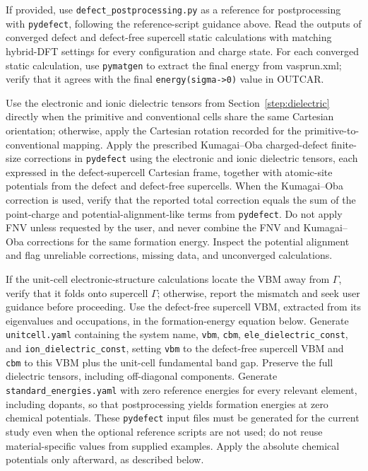 \documentclass[aip,jap,reprint,amsmath,amssymb]{revtex4-2}
\begin{document}
If provided, use \texttt{defect\_postprocessing.py} as a reference for postprocessing with \texttt{pydefect},\cite{Kumagai2021} following the reference-script guidance above. Read the outputs of converged defect and defect-free supercell static calculations with matching hybrid-DFT settings for every configuration and charge state. For each converged static calculation, use \texttt{pymatgen} to extract the final energy from vasprun.xml; verify that it agrees with the final \texttt{energy(sigma->0)} value in OUTCAR.

Use the electronic and ionic dielectric tensors from Section~\ref{step:dielectric} directly when the primitive and conventional cells share the same Cartesian orientation; otherwise, apply the Cartesian rotation recorded for the primitive-to-conventional mapping. Apply the prescribed Kumagai--Oba charged-defect finite-size corrections in \texttt{pydefect} using the electronic and ionic dielectric tensors, each expressed in the defect-supercell Cartesian frame, together with atomic-site potentials from the defect and defect-free supercells. When the Kumagai--Oba correction is used, verify that the reported total correction equals the sum of the point-charge and potential-alignment-like terms from \texttt{pydefect}. Do not apply FNV unless requested by the user, and never combine the FNV and Kumagai--Oba corrections for the same formation energy. Inspect the potential alignment and flag unreliable corrections, missing data, and unconverged calculations.

If the unit-cell electronic-structure calculations locate the VBM away from $\Gamma$, verify that it folds onto supercell $\Gamma$; otherwise, report the mismatch and seek user guidance before proceeding. Use the defect-free supercell VBM, extracted from its eigenvalues and occupations, in the formation-energy equation below. Generate \texttt{unitcell.yaml} containing the system name, \texttt{vbm}, \texttt{cbm}, \texttt{ele\_dielectric\_const}, and \texttt{ion\_dielectric\_const}, setting \texttt{vbm} to the defect-free supercell VBM and \texttt{cbm} to this VBM plus the unit-cell fundamental band gap. Preserve the full dielectric tensors, including off-diagonal components. Generate \texttt{standard\_energies.yaml} with zero reference energies for every relevant element, including dopants, so that postprocessing yields formation energies at zero chemical potentials. These \texttt{pydefect} input files must be generated for the current study even when the optional reference scripts are not used; do not reuse material-specific values from supplied examples. Apply the absolute chemical potentials only afterward, as described below.
\end{document}
